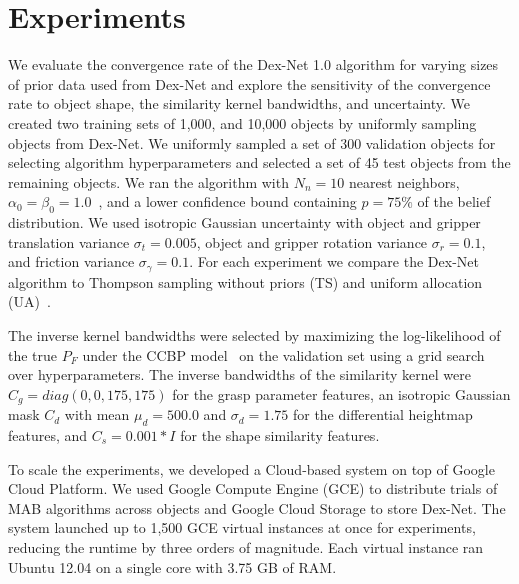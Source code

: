 \section{Experiments}

We evaluate the convergence rate of the Dex-Net 1.0 algorithm for varying sizes of prior data used from Dex-Net and explore the sensitivity of the convergence rate to object shape, the similarity kernel bandwidths, and uncertainty.
We created two training sets of 1,000, and 10,000 objects by uniformly sampling objects from Dex-Net.
We uniformly sampled a set of 300 validation objects for selecting algorithm hyperparameters and selected a set of 45 test objects from the remaining objects.
We ran the algorithm with $N_n = 10$ nearest neighbors, $\alpha_0 = \beta_0 = 1.0$~\cite{laskey2015bandits}, and a lower confidence bound containing $p=75\%$ of the belief distribution.
We used isotropic Gaussian uncertainty with object and gripper translation variance $\sigma_{t} = 0.005$, object and gripper rotation variance $\sigma_{r} = 0.1$, and friction variance $\sigma_{\gamma} = 0.1$.
For each experiment we compare the Dex-Net algorithm to Thompson sampling without priors (TS) and uniform allocation (UA)~\cite{laskey2015bandits}.

The inverse kernel bandwidths were selected by maximizing the log-likelihood of the true $P_F$ under the CCBP model~\cite{goetschalckx2011continuous} on the validation set using a grid search over hyperparameters.
The inverse bandwidths of the similarity kernel were $C_g = diag(0,0,175, 175)$ for the grasp parameter features, an isotropic Gaussian mask $C_d$ with mean $\mu_d = 500.0$ and $\sigma_d = 1.75$ for the differential heightmap features, and $C_s = 0.001 * I$ for the shape similarity features.

To scale the experiments, we developed a Cloud-based system on top of Google Cloud Platform.
We used Google Compute Engine (GCE) to distribute trials of MAB algorithms across objects and Google Cloud Storage to store Dex-Net.
The system launched up to 1,500 GCE virtual instances at once for experiments, reducing the runtime by three orders of magnitude.
Each virtual instance ran Ubuntu 12.04 on a single core with 3.75 GB of RAM.

